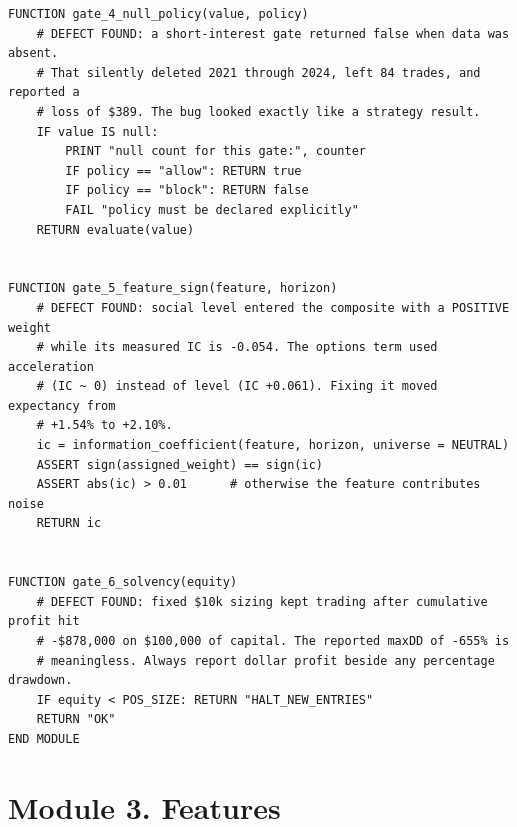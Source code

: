 \documentclass[10pt]{article}
\begin{document}
\begin{lstlisting}
FUNCTION gate_4_null_policy(value, policy)
    # DEFECT FOUND: a short-interest gate returned false when data was absent.
    # That silently deleted 2021 through 2024, left 84 trades, and reported a
    # loss of $389. The bug looked exactly like a strategy result.
    IF value IS null:
        PRINT "null count for this gate:", counter
        IF policy == "allow": RETURN true
        IF policy == "block": RETURN false
        FAIL "policy must be declared explicitly"
    RETURN evaluate(value)


FUNCTION gate_5_feature_sign(feature, horizon)
    # DEFECT FOUND: social level entered the composite with a POSITIVE weight
    # while its measured IC is -0.054. The options term used acceleration
    # (IC ~ 0) instead of level (IC +0.061). Fixing it moved expectancy from
    # +1.54% to +2.10%.
    ic = information_coefficient(feature, horizon, universe = NEUTRAL)
    ASSERT sign(assigned_weight) == sign(ic)
    ASSERT abs(ic) > 0.01      # otherwise the feature contributes noise
    RETURN ic


FUNCTION gate_6_solvency(equity)
    # DEFECT FOUND: fixed $10k sizing kept trading after cumulative profit hit
    # -$878,000 on $100,000 of capital. The reported maxDD of -655% is
    # meaningless. Always report dollar profit beside any percentage drawdown.
    IF equity < POS_SIZE: RETURN "HALT_NEW_ENTRIES"
    RETURN "OK"
END MODULE
\end{lstlisting}

\section{Module 3. Features}
\end{document}
